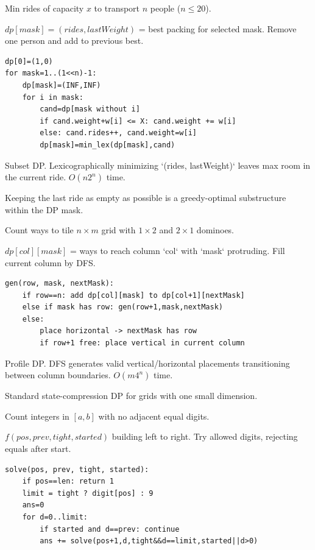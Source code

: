 
\Problem Min rides of capacity $x$ to transport $n$ people ($n \le 20$).

\State $dp[mask]=(rides,lastWeight)$ = best packing for selected mask.
\Trans Remove one person and add to previous best.
\begin{lstlisting}
dp[0]=(1,0)
for mask=1..(1<<n)-1:
    dp[mask]=(INF,INF)
    for i in mask:
        cand=dp[mask without i]
        if cand.weight+w[i] <= X: cand.weight += w[i]
        else: cand.rides++, cand.weight=w[i]
        dp[mask]=min_lex(dp[mask],cand)
\end{lstlisting}

\Solution Subset DP. Lexicographically minimizing `(rides, lastWeight)` leaves max room in the current ride. $O(n 2^n)$ time.

\Analysis Keeping the last ride as empty as possible is a greedy-optimal substructure within the DP mask.


\Problem Count ways to tile $n \times m$ grid with $1 \times 2$ and $2 \times 1$ dominoes.

\State $dp[col][mask]$ = ways to reach column `col` with `mask` protruding.
\Trans Fill current column by DFS.
\begin{lstlisting}
gen(row, mask, nextMask):
    if row==n: add dp[col][mask] to dp[col+1][nextMask]
    else if mask has row: gen(row+1,mask,nextMask)
    else:
        place horizontal -> nextMask has row
        if row+1 free: place vertical in current column
\end{lstlisting}

\Solution Profile DP. DFS generates valid vertical/horizontal placements transitioning between column boundaries. $O(m 4^n)$ time.

\Analysis Standard state-compression DP for grids with one small dimension.


\Problem Count integers in $[a,b]$ with no adjacent equal digits.

\State $f(pos,prev,tight,started)$ building left to right.
\Trans Try allowed digits, rejecting equals after start.
\begin{lstlisting}
solve(pos, prev, tight, started):
    if pos==len: return 1
    limit = tight ? digit[pos] : 9
    ans=0
    for d=0..limit:
        if started and d==prev: continue
        ans += solve(pos+1,d,tight&&d==limit,started||d>0)
\end{lstlisting}


